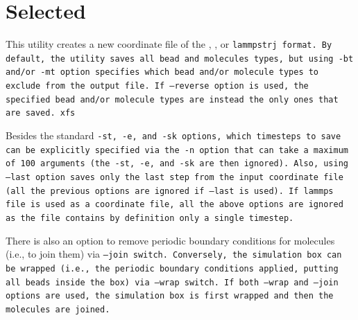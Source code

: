 \section{Selected} \label{sec:Selected}

This utility creates a new coordinate file of the \xyz, \vcf, or \tt{lammpstrj}
format. By default, the utility saves all bead and molecules types, but using
\tt{-bt} and/or \tt{-mt} option specifies which bead and/or molecule types to
exclude from the output file. If \tt{--reverse} option is used, the specified
bead and/or molecule types are instead the only ones that are saved.
xfs

Besides the standard \tt{-st}, \tt{-e}, and \tt{-sk} options, which timesteps to
save can be explicitly specified via the \tt{-n} option that can take a maximum
of 100 arguments (the \tt{-st}, \tt{-e}, and \tt{-sk} are then ignored). Also,
using \tt{--last} option saves only the last step from the input coordinate file
(all the previous options are ignored if \tt{--last} is used). If lammps \data
file is used as a coordinate file, all the above options are ignored as the
\data file contains by definition only a single timestep.

There is also an option to remove periodic boundary conditions for molecules
(i.e., to join them) via \tt{--join} switch. Conversely, the simulation box can
be wrapped (i.e., the periodic boundary conditions applied, putting all beads
inside the box) via \tt{--wrap} switch. If both \tt{--wrap} and \tt{--join}
options are used, the simulation box is first wrapped and then the molecules are
joined.

